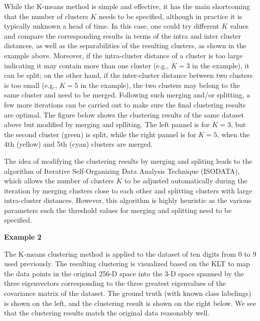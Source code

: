 \documentclass{article}
\begin{document}


While the K-means method is simple and effective, it has the main shortcoming 
that the number of clusters $K$ needs to be specified, although in practice it 
is typically unknown a head of time. In this case, one could try different $K$ 
values and compare the corresponding results in terms of the intra and inter 
cluster distances, as well as the separabilities of the resulting clusters, as 
shown in the example above. Moreover, if the intra-cluster distance of a cluster 
is too large indicating it may contain more than one cluster (e.g., $K=3$ in 
the example), it can be split; on the other hand, if the inter-cluster distance 
between two clusters is too small (e.g., $K=5$ in the example), the two clusters
may belong to the same cluster and need to be merged. Following such merging 
and/or splitting, a few more iterations can be carried out to make sure the
final clustering results are optimal. The figure below shows the clustering
results of the same dataset above but modified by merging and splliting. The
left pannel is for $K=3$, but the second cluster (green) is split, while the
right pannel is for $K=5$, when the 4th (yellow) and 5th (cyan) clusters are 
merged.



The idea of modifying the clustering results by merging and spliting leads to 
the algorithm of Iterative Self-Organizing Data Analysis Technique (ISODATA), 
which allows the number of clusters $K$ to be adjusted automatically during the 
iteration by merging clusters close to each other and splitting clusters with 
large intra-cluster distances. However, this algorithm is highly heuristic as 
the various parameters such the threshold values for merging and splitting need
to be specified.

{\bf Example 2}

The K-means clustering method is applied to the dataset of ten digits from 
0 to 9 used previously. The resulting clustering is visualized based on the
KLT to map the data points in the original 256-D space into the 3-D space 
spanned by the three eigenvectors corresponding to the three greatest 
eigenvalues of the covariance matrix of the dataset. The ground truth (with
known class labelings) is shown on the left, and the clustering result is
shown on the right below. We see that the clustering results match the
original data reasonably well.

\end{document}
